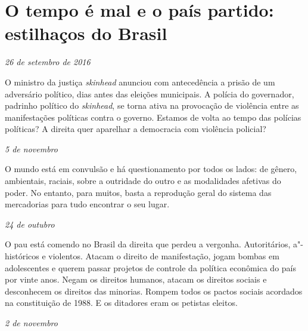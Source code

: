 \chapter{O tempo é mal e o país partido: estilhaços do Brasil}

\begin{flushright}
\emph{26 de setembro de 2016}
\end{flushright}

O ministro da justiça \emph{skinhead} anunciou com antecedência a prisão de um
adversário político, dias antes das eleições municipais. A polícia do
governador, padrinho político do \emph{skinhead}, se torna ativa na provocação
de violência entre as manifestações políticas contra o governo. Estamos
de volta ao tempo das polícias políticas? A direita quer aparelhar a
democracia com violência policial?

\begin{flushright}
\emph{5 de novembro}
\end{flushright}

O mundo está em convulsão e há questionamento por todos os lados: de
gênero, ambientais, raciais, sobre a outridade do outro e as modalidades
afetivas do poder. No entanto, para muitos, basta a reprodução geral do
sistema das mercadorias para tudo encontrar o seu lugar.

\pagebreak

\begin{flushright}
\emph{24 de outubro}
\end{flushright}

O pau está comendo no Brasil da direita que perdeu a vergonha.
Autoritários, a"-históricos e violentos. Atacam o direito de
manifestação, jogam bombas em adolescentes e querem passar projetos de
controle da política econômica do país por vinte anos. Negam os direitos
humanos, atacam os direitos sociais e desconhecem os direitos das
minorias. Rompem todos os pactos sociais acordados na constituição de
1988. E os ditadores eram os petistas eleitos.

\begin{flushright}
\emph{2 de novembro}
\end{flushright}

